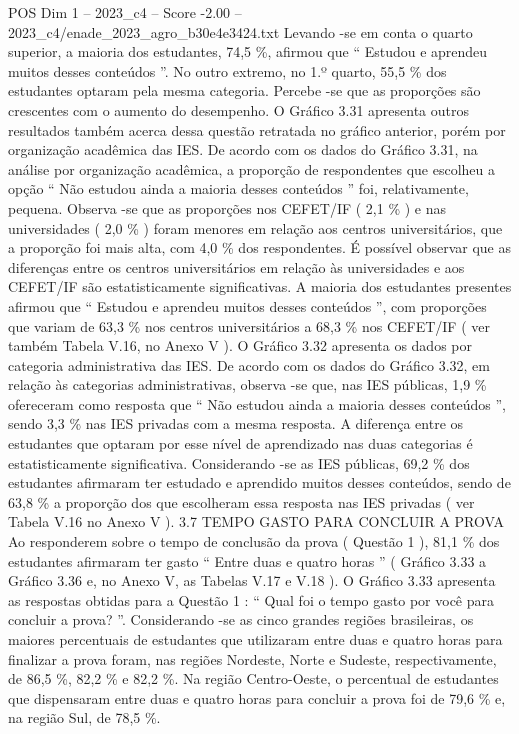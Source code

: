 \begin{textsample}{POS Dim 1 – 2023\_c4 – Score -2.00 – 2023\_c4/enade\_2023\_agro\_b30e4e3424.txt}
Levando -se em conta o quarto superior, a maioria dos estudantes, 74,5 \%, afirmou que “ Estudou e aprendeu muitos desses conteúdos ”.
No outro extremo, no 1.º quarto, 55,5 \% dos estudantes optaram pela mesma categoria.
Percebe -se que as proporções são crescentes com o aumento do desempenho.
O Gráfico 3.31 apresenta outros resultados também acerca dessa questão retratada no gráfico anterior, porém por organização acadêmica das IES.
De acordo com os dados do Gráfico 3.31, na análise por organização acadêmica, a proporção de respondentes que escolheu a opção “ Não estudou ainda a maioria desses conteúdos ” foi, relativamente, pequena.
Observa -se que as proporções nos CEFET/IF ( 2,1 \% ) e nas universidades ( 2,0 \% ) foram menores em relação aos centros universitários, que a proporção foi mais alta, com 4,0 \% dos respondentes.
É possível observar que as diferenças entre os centros universitários em relação às universidades e aos CEFET/IF são estatisticamente significativas.
A maioria dos estudantes presentes afirmou que “ Estudou e aprendeu muitos desses conteúdos ”, com proporções que variam de 63,3 \% nos centros universitários a 68,3 \% nos CEFET/IF ( ver também Tabela V.16, no Anexo V ).
O Gráfico 3.32 apresenta os dados por categoria administrativa das IES.
De acordo com os dados do Gráfico 3.32, em relação às categorias administrativas, observa -se que, nas IES públicas, 1,9 \% ofereceram como resposta que “ Não estudou ainda a maioria desses conteúdos ”, sendo 3,3 \% nas IES privadas com a mesma resposta.
A diferença entre os estudantes que optaram por esse nível de aprendizado nas duas categorias é estatisticamente significativa.
Considerando -se as IES públicas, 69,2 \% dos estudantes afirmaram ter estudado e aprendido muitos desses conteúdos, sendo de 63,8 \% a proporção dos que escolheram essa resposta nas IES privadas ( ver Tabela V.16 no Anexo V ). 3.7 TEMPO GASTO PARA CONCLUIR A PROVA Ao responderem sobre o tempo de conclusão da prova ( Questão 1 ), 81,1 \% dos estudantes afirmaram ter gasto “ Entre duas e quatro horas ” ( Gráfico 3.33 a Gráfico 3.36 e, no Anexo V, as Tabelas V.17 e V.18 ).
O Gráfico 3.33 apresenta as respostas obtidas para a Questão 1 : “ Qual foi o tempo gasto por você para concluir a prova? ”.
Considerando -se as cinco grandes regiões brasileiras, os maiores percentuais de estudantes que utilizaram entre duas e quatro horas para finalizar a prova foram, nas regiões Nordeste, Norte e Sudeste, respectivamente, de 86,5 \%, 82,2 \% e 82,2 \%.
Na região Centro-Oeste, o percentual de estudantes que dispensaram entre duas e quatro horas para concluir a prova foi de 79,6 \% e, na região Sul, de 78,5 \%.

\end{textsample}
